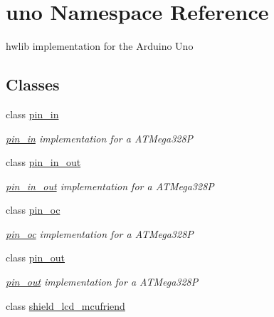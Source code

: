 \hypertarget{namespaceuno}{}\section{uno Namespace Reference}
\label{namespaceuno}


hwlib implementation for the Arduino Uno  


\subsection*{Classes}
\begin{DoxyCompactItemize}
\item 
class \hyperlink{classuno_1_1pin__in}{pin\+\_\+in}
\begin{DoxyCompactList}\small\item\em \hyperlink{classuno_1_1pin__in}{pin\+\_\+in} implementation for a A\+T\+Mega328P \end{DoxyCompactList}\item 
class \hyperlink{classuno_1_1pin__in__out}{pin\+\_\+in\+\_\+out}
\begin{DoxyCompactList}\small\item\em \hyperlink{classuno_1_1pin__in__out}{pin\+\_\+in\+\_\+out} implementation for a A\+T\+Mega328P \end{DoxyCompactList}\item 
class \hyperlink{classuno_1_1pin__oc}{pin\+\_\+oc}
\begin{DoxyCompactList}\small\item\em \hyperlink{classuno_1_1pin__oc}{pin\+\_\+oc} implementation for a A\+T\+Mega328P \end{DoxyCompactList}\item 
class \hyperlink{classuno_1_1pin__out}{pin\+\_\+out}
\begin{DoxyCompactList}\small\item\em \hyperlink{classuno_1_1pin__out}{pin\+\_\+out} implementation for a A\+T\+Mega328P \end{DoxyCompactList}\item 
class \hyperlink{classuno_1_1shield__lcd__mcufriend}{shield\+\_\+lcd\+\_\+mcufriend}
\end{DoxyCompactItemize}
